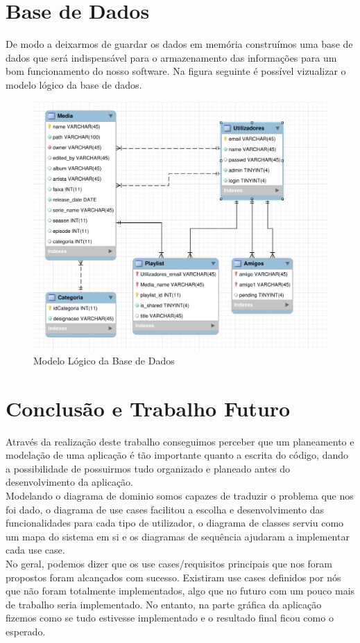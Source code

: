 \documentclass[a4paper]{report}
\begin{document}
\chapter{Base de Dados}

De modo a deixarmos de guardar os dados em memória construímos uma base de dados
que será indispensável para o armazenamento das informações para um bom funcionamento
do nosso software.
Na figura seguinte é possível vizualizar o modelo lógico da base de dados.

\begin{figure}[H]
	\centering 
    \includegraphics[width=\textwidth]{images/db.png}  
    \caption{Modelo Lógico da Base de Dados}
\end{figure}

\chapter{Conclusão e Trabalho Futuro}

Através da realização deste trabalho conseguimos perceber que um planeamento e modelação
de uma aplicação é tão importante quanto a escrita do código, dando a possibilidade de 
possuirmos tudo organizado e planeado antes do desenvolvimento da aplicação.\\
Modelando o diagrama de dominio somos capazes de traduzir o problema que nos foi dado,
o diagrama de use cases facilitou a escolha e desenvolvimento das funcionalidades para cada
tipo de utilizador, o diagrama de classes serviu como um mapa do sistema em si e os diagramas
de sequência ajudaram a implementar cada use case.\\
No geral, podemos dizer que os use cases/requisitos principais que nos foram propostos foram 
alcançados com sucesso. Existiram use cases definidos por nós que não foram totalmente
implementados, algo que no futuro com um pouco mais de trabalho seria implementado. No entanto,
na parte gráfica da aplicação fizemos como se tudo estivesse implementado e o resultado final
ficou como o esperado.
 
\end{document}
